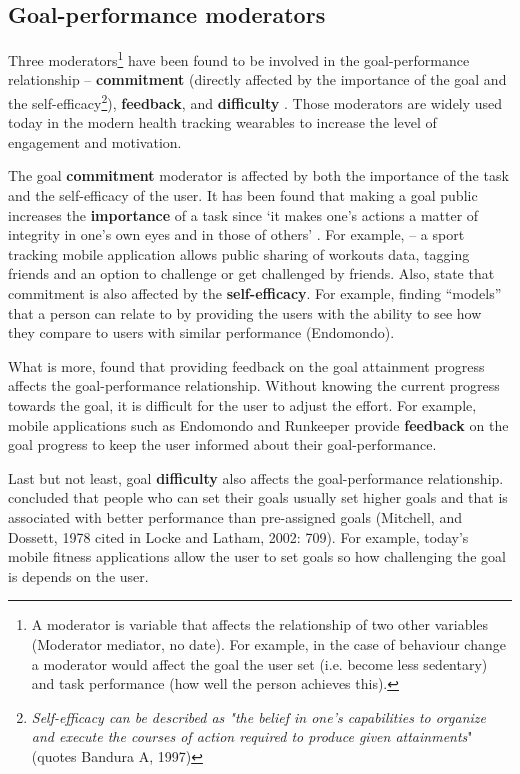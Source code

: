     \subsection{Goal-performance moderators}
    \label{goal-moderators}
    Three moderators\footnote{A moderator is variable that affects the relationship of two other variables (Moderator mediator, no date). For example, in the case of behaviour change a moderator would affect the goal the user set (i.e. become less sedentary) and task performance (how well the person achieves this).} have been found to be involved in the goal-performance relationship – \textbf{commitment} (directly affected by the importance of the goal and the self-efficacy\footnote{\textit{Self-efficacy can be described as "the belief in one’s capabilities to organize and execute the courses of action required to produce given attainments}" \citep[308]{williams2011} (quotes Bandura A, 1997)}), \textbf{feedback}, and \textbf{difficulty} \citep[707]{locke2002}. Those moderators are widely used today in the modern health tracking wearables to increase the level of engagement and motivation.
    
    The goal \textbf{commitment} moderator is affected by both the importance of the task and the self-efficacy of the user. It has been found that making a goal public increases the \textbf{importance} of a task since ‘it makes one’s actions a matter of integrity in one’s own eyes and in those of others’ \citep[707]{locke2002}. For example, \citet[]{endomondo2017} – a sport tracking mobile application allows public sharing of workouts data, tagging friends and an option to challenge or get challenged by friends. Also, \citet[708]{locke2002} state that commitment is also affected by the \textbf{self-efficacy}. For example, finding “models” that a person can relate to by providing the users with the ability to see how they compare to users with similar performance (Endomondo).
    
    What is more, \citet[708]{locke2002} found that providing feedback on the goal attainment progress affects the goal-performance relationship. Without knowing the current progress towards the goal, it is difficult for the user to adjust the effort. For example, mobile applications such as Endomondo and Runkeeper \citep{fitnesskeeper2017} provide \textbf{feedback} on the goal progress to keep the user informed about their goal-performance.
    
    Last but not least, goal \textbf{difficulty} also affects the goal-performance relationship. \citet[709]{locke2002} concluded that people who can set their goals usually set higher goals and that is associated with better performance than pre-assigned goals (Mitchell, and Dossett, 1978 cited in Locke and Latham, 2002: 709). For example, today’s mobile fitness applications allow the user to set goals \citep{fitnesskeeper2017,endomondo2017} so how challenging the goal is depends on the user.
    
